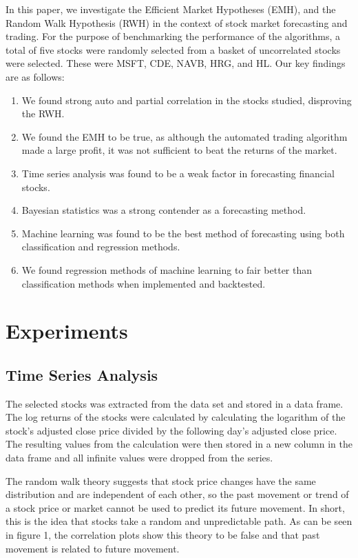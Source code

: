 \documentclass[times]{jtitauth}
\begin{document}
In this paper, we investigate the Efficient Market Hypotheses (EMH), and the Random Walk Hypothesis (RWH) in the context of stock market forecasting and trading. For the purpose of benchmarking the performance of the algorithms, a total of five stocks were randomly selected from a basket of uncorrelated stocks were selected. These were MSFT, CDE, NAVB, HRG, and HL. Our key findings are as follows:

\begin{enumerate}
  \item We found strong auto and partial correlation in the stocks studied, disproving the RWH.
  \item We found the EMH to be true, as although the automated trading algorithm made a large profit, it was not sufficient to beat the returns of the market.
  \item Time series analysis was found to be a weak factor in forecasting financial stocks.
  \item Bayesian statistics was a strong contender as a forecasting method.
  \item Machine learning was found to be the best method of forecasting using both classification and regression methods. 
  \item We found regression methods of machine learning to fair better than classification methods when implemented and backtested.
\end{enumerate}

\section{Experiments}

\subsection{Time Series Analysis}
The selected stocks was extracted from the data set and stored in a data frame. The log returns of the stocks were calculated by calculating the logarithm of the stock's adjusted close price divided by the following day's adjusted close price. The resulting values from the calculation were then stored in a new column in the data frame and all infinite values were dropped from the series.

The random walk theory suggests that stock price changes have the same distribution and are independent of each other, so the past movement or trend of a stock price or market cannot be used to predict its future movement. In short, this is the idea that stocks take a random and unpredictable path. As can be seen in figure 1, the correlation plots show this theory to be false and that past movement is related to future movement.
\end{document}
